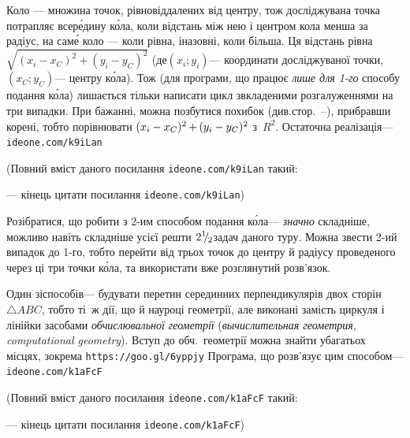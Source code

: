\documentclass[14pt,a4paper]{extarticle}
\def\dib#1{\,#1\discretionary{}{\mbox{$#1$}}{}\,}
\renewcommand{\baselinestretch}{1.3125}
\begin{document}
\Tutorial	Коло --- множина точок, рівновіддалених від центру, тож досліджувана точка потрапляє всер\'{е}дину к\'{о}ла, коли відстань між нею і центром кола менша за радіус, на сам\'{е} коло --- коли рівна, і\nolinebreak[3] назовні, коли більша. Ця відстань рівна $\sqrt{(x_i-x_C)^2+(y_i-y_C)^2}$ (де\nolinebreak[3] $(x_i; y_i)$\nolinebreak[3] --- координати досліджуваної точки, $(x_C; y_C)$\nolinebreak[3] --- центру к\'{о}ла). Тож (для програми, що працює \emph{лише для \mbox{1-го}} способу подання к\'{о}ла) лишається тільки написати цикл з\nolinebreak[3] вкладеними розгалуженнями на три випадки. При бажанні, можна позбутися похибок (див.\nolinebreak[3] стор.~\pageref{sec:floating-point}--\nolinebreak[3]\pageref{text:floating-point-end}), прибравши корені, тобто порівнювати ${(x_i-x_C)^2}\dib{{+}}{(y_i-y_C)^2}$ з~$R^2$. Остаточна реалізація\nolinebreak[3] --- 
\verb"ideone.com/k9iLan"


{\color{green}\begin{small}

\renewcommand{\baselinestretch}{0.875}

(Повний вміст даного посилання \verb"ideone.com/k9iLan" такий:

--- кінець цитати посилання \verb"ideone.com/k9iLan")

\end{small}}




Розібратися, що робити з \mbox{2-им} способом подання к\'{о}ла\nolinebreak[3] --- \emph{значно} складніше, можливо навіть складніше усієї решти 
${2\lefteqn{{}^{1}}{}^{\,}\lefteqn{/}{}_{\,\,\,2}}$\nolinebreak[3] задач даного туру. Можна звести \mbox{2-ий} випадок до \mbox{1-го}, тобто перейти від трьох точок до центру й радіусу проведеного через ці три точки к\'{о}ла, та використати вже розглянутий розв'язок.

Один зі\nolinebreak[3] способів\nolinebreak[3] --- будувати перетин серединних перпендикулярів двох сторін $\triangle{}ABC$, тобто ті~ж дії, що й на\nolinebreak[3] уроці геометрії, але виконані замість циркуля і лінійки засобами \emph{обчислювальної геометрії} (\emph{вычислительная геометрия}, \emph{computational geometry}). Вступ до обч.~геометрії можна знайти у\nolinebreak[3] багатьох місцях, зокрема \verb"https://goo.gl/6yppjy"\hspace{0.5em plus 1em} Програма, що розв'язує цим способом\nolinebreak[3] --- 
\verb"ideone.com/k1aFcF"


{\color{green}\begin{small}

\renewcommand{\baselinestretch}{0.875}

(Повний вміст даного посилання \verb"ideone.com/k1aFcF" такий:

--- кінець цитати посилання \verb"ideone.com/k1aFcF")

\end{small}}
\end{document}
